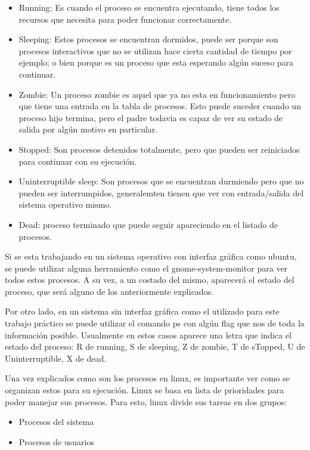 \documentclass[a4paper, 12pt]{article}
\begin{document}
\begin{itemize}
\item Running: Es cuando el proceso se encuentra ejecutando, tiene todos los recursos que necesita para poder funcionar correctamente.
\item Sleeping: Estos procesos se encuentran dormidos, puede ser porque son procesos interactivos que no se utilizan hace cierta cantidad de tiempo por ejemplo; o bien porque es un proceso que esta esperando alg\'un suceso para continuar.
\item Zombie: Un proceso zombie es aquel que ya no esta en funcionamiento pero que tiene una entrada en la tabla de procesos. Esto puede suceder cuando un proceso hijo termina, pero el padre todavia es capaz de ver su estado de salida por alg\'un motivo en particular. 
\item Stopped: Son procesos detenidos totalmente, pero que pueden ser reiniciados para continuar con su ejecuci\'on. 
\item Uninterruptible sleep: Son procesos que se encuentran durmiendo pero que no pueden ser interrumpidos, generalemten tienen que ver con entrada/salida del sistema operativo mismo.
\item Dead: proceso terminado que puede seguir apareciendo en el listado de procesos.
\end{itemize}


Si se esta trabajando en un sistema operativo con interfaz gr\'afica como ubuntu, se puede utilizar alguna herramiento como el gnome-system-monitor para ver todos estos procesos. A su vez, a un costado del mismo, aparecer\'a el estado del proceso, que ser\'a alguno de los anteriormente explicados.

Por otro lado, en un sistema sin interfaz gr\'afica como el utilizado para este trabajo pr\'actico se puede utilizar el comando ps con alg\'un flag que nos de toda la informaci\'on posible. Usualmente en estos casos aparece una letra que indica el estado del proceso: R de running, S de sleeping, Z de zombie, T de sTopped, U de Uninterruptible, X de dead.

\bigskip

Una vez explicados como son los procesos en linux, es importante ver como se organizan estos para su ejecuci\'on. Linux se basa en lista de prioridades para poder manejar sus procesos. Para esto, linux divide sus tareas en dos grupos:

\begin{itemize}
\item Procesos del sistema
\item Procesos de usuarios
\end{itemize}
\end{document}
